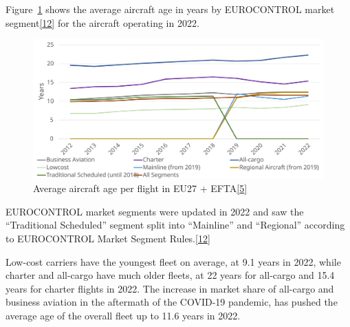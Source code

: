 \documentclass[
  11pt,
  a4paper,
]{book}
\begin{document}
Figure~\ref{fig-average-aircraft-age} shows the average aircraft age in
years by EUROCONTROL market
segment\protect\hyperlink{ref-ectl:market:seg:2022}{{[}12{]}} for the
aircraft operating in 2022.

\begin{figure}

{\centering \includegraphics{chapters/../figures/aircraft_age_per_flight.svg}

}

\caption{\label{fig-average-aircraft-age}Average aircraft age per flight
in EU27 + EFTA\protect\hyperlink{ref-ectrl:statfor:sid}{{[}5{]}}}

\end{figure}

\begin{tcolorbox}[enhanced jigsaw, opacityback=0, arc=.35mm, colframe=quarto-callout-note-color-frame, breakable, left=2mm, leftrule=.75mm, titlerule=0mm, colbacktitle=quarto-callout-note-color!10!white, rightrule=.15mm, opacitybacktitle=0.6, bottomtitle=1mm, colback=white, toptitle=1mm, title=\textcolor{quarto-callout-note-color}{\faInfo}\hspace{0.5em}{Note}, bottomrule=.15mm, toprule=.15mm, coltitle=black]

EUROCONTROL market segments were updated in 2022 and saw the
``Traditional Scheduled'' segment split into ``Mainline'' and
``Regional'' according to EUROCONTROL Market Segment
Rules.\protect\hyperlink{ref-ectl:market:seg:2022}{{[}12{]}}

\end{tcolorbox}

Low-cost carriers have the youngest fleet on average, at 9.1 years in
2022, while charter and all-cargo have much older fleets, at 22 years
for all-cargo and 15.4 years for charter flights in 2022. The increase
in market share of all-cargo and business aviation in the aftermath of
the COVID-19 pandemic, has pushed the average age of the overall fleet
up to 11.6 years in 2022.
\end{document}
